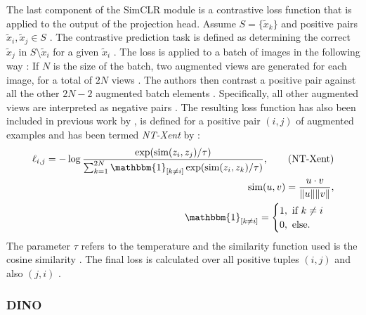 \par 
The last component of the SimCLR module is a contrastive loss function that is applied to the output of the projection head.
Assume $S=\{{\tilde{x}}_k\}$ and positive pairs $\tilde{x}_i, \tilde{x}_j \in S$ \citep{Chen2020}.
The contrastive prediction task is defined as determining the correct $\tilde{x}_j$ in $S\setminus \tilde{x}_i$ for a given $\tilde{x}_i$ \citep{Chen2020}.
The loss is applied to a batch of images in the following way \citep{Chen2020}:
If $N$ is the size of the batch, two augmented views are generated for each image, for a total of $2N$ views \citep{Chen2020}.
The authors then contrast a positive pair against all the other $2N-2$ augmented batch elements \citep{Chen2020}.
Specifically, all other augmented views are interpreted as negative pairs \citep{Chen2020}.
The resulting loss function has also been included in previous work by \citep{Sohn2016,Wu2018,Oord2018}, is defined for a positive pair $(i,j)$ of augmented examples and has been termed \textit{NT-Xent} by \citep{Chen2017}:
\begin{align}
	\ell_{i,j} = -\log\frac{\exp(\text{sim}(z_i,z_j)/\tau)}{\sum_{k=1}^{2N} \mathbbm{1}_{[k \neq i]}\exp(\text{sim}(z_i,z_k)/\tau)}, \tag{NT-Xent}\\
	\text{sim}(u,v) = \frac{u\cdot v}{\Vert u \Vert \Vert v \Vert}, \\
	\mathbbm{1}_{[k \neq i]} = \begin{cases}
		1, \text{ if } k \neq i \\
		0, \text{ else}.
	\end{cases}
\end{align}
The parameter $\tau$ refers to the temperature and the similarity function used is the cosine similarity \citep{Chen2020}.
The final loss is calculated over all positive tuples $(i, j)$ and also $(j, i)$ \citep{Chen2020}.
\subsubsection{DINO}
